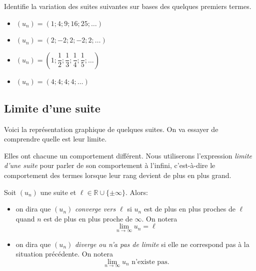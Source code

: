 \documentclass[a4paper,12pt]{report}
\newcommand{\IR}{\mathbb{R}}
\begin{document}
Identifie la variation des suites suivantes sur bases des quelques premiers
termes.

\par \setlength{\columnseprule}{0 pt}
          \begin{minipage}[t]{\linewidth}
          \begin{multicols}{2}
\begin{itemize}
\item \((u_n)=(1;4;9;16;25;\ldots)\)
\item \((u_n)=(2;-2;2;-2;2;\ldots)\)
\end{itemize}
\begin{itemize}
\item \((u_n)=\left(1;\dfrac{1}{2};\dfrac{1}{3};\dfrac{1}{4};\dfrac{1}{5};\ldots\right)\)
\item \((u_n)=(4;4;4;4;\ldots)\)
\end{itemize}


\end{multicols}\end{minipage}

\subsection{Limite d'une suite}
\label{sec:orgfe66839}

Voici la représentation graphique de quelques suites. On va essayer de
comprendre quelle est leur limite.


\begin{center}

\end{center}


Elles ont chacune un comportement différent. Nous utiliserons l'expression
\emph{limite d'une suite} pour parler de son comportement à l'infini, c'est-à-dire
le comportement des termes lorsque leur rang devient de plus en plus grand.

\begin{definition}
Soit \((u_n)\) une suite et \(\ell\in\IR\cup\{\pm\infty\}\). Alors:

\begin{itemize}
\item on dira que \((u_n)\) \emph{converge vers \(\ell\)} si \(u_n\) est de plus en
plus proches de \(\ell\) quand \(n\) est de plus en plus proche de \(\infty\). On notera
\[\lim_{n\to\infty}u_n=\ell\]
\item on dira que \((u_n)\) \emph{diverge ou n'a pas de limite} si elle ne correspond pas
à la situation précédente. On notera
\[\lim_{n\to\infty}u_n\text{ n'existe pas.}\]
\end{itemize}
\end{definition}
\end{document}
